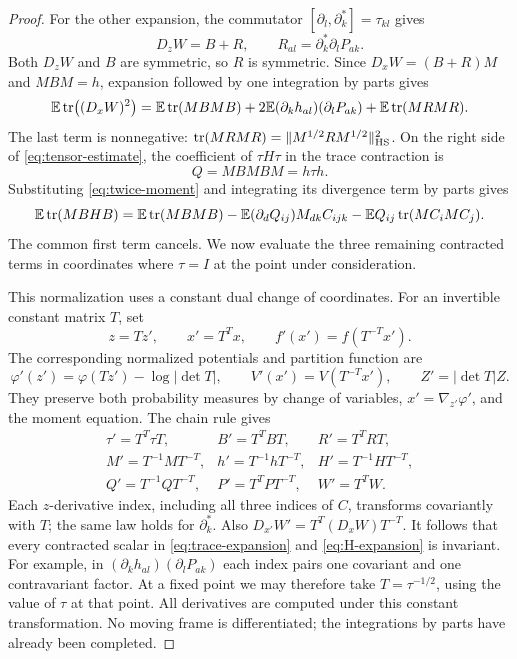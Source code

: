 \begin{proof}
For the other expansion, the commutator $[\partial_l,\partial_k^*]=\tau_{kl}$ gives
\[
 D_zW=B+R,\qquad R_{al}=\partial_k^*\partial_lP_{ak}.
\]
Both $D_zW$ and $B$ are symmetric, so $R$ is symmetric. Since $D_xW=(B+R)M$ and $MBM=h$, expansion followed by one integration by parts gives
\begin{equation}\label{eq:trace-expansion}
 \mathbb{E}\tr\bigl((D_xW)^2\bigr)
 =\mathbb{E}\tr(MBMB)
  +2\mathbb{E}(\partial_kh_{al})(\partial_lP_{ak})
  +\mathbb{E}\tr(MRMR).
\end{equation}
The last term is nonnegative: $\tr(MRMR)=\|M^{1/2}RM^{1/2}\|_{\mathrm{HS}}^2$. On the right side of \eqref{eq:tensor-estimate}, the coefficient of $\tau H\tau$ in the trace contraction is
\[
 Q=MBMBM=h\tau h.
\]
Substituting \eqref{eq:twice-moment} and integrating its divergence term by parts gives
\begin{equation}\label{eq:H-expansion}
 \mathbb{E}\tr(MBHB)
 =\mathbb{E}\tr(MBMB)
   -\mathbb{E}(\partial_dQ_{ij})M_{dk}C_{ijk}
   -\mathbb{E}Q_{ij}\tr(MC_iMC_j).
\end{equation}
The common first term cancels.  We now evaluate the three remaining contracted terms in coordinates where $\tau=I$ at the point under consideration.

This normalization uses a constant dual change of coordinates. For an invertible constant matrix $T$, set
\[
 z=Tz',\qquad x'=T^Tx,\qquad
 f'(x')=f(T^{-T}x').
\]
The corresponding normalized potentials and partition function are
\[
 \varphi'(z')=\varphi(Tz')-\log|\det T|,
 \qquad V'(x')=V(T^{-T}x'),
 \qquad Z'=|\det T|Z.
\]
They preserve both probability measures by change of variables, $x'=\nabla_{z'}\varphi'$, and the moment equation.  The chain rule gives
\[
 \begin{array}{lll}
 \tau'=T^T\tau T,& B'=T^TBT,& R'=T^TRT,\\
 M'=T^{-1}MT^{-T},& h'=T^{-1}hT^{-T},& H'=T^{-1}HT^{-T},\\
 Q'=T^{-1}QT^{-T},& P'=T^TPT^{-T},& W'=T^TW.
 \end{array}
\]
Each $z$-derivative index, including all three indices of $C$, transforms covariantly with $T$; the same law holds for $\partial_k^*$. Also $D_{x'}W'=T^T(D_xW)T^{-T}$. It follows that every contracted scalar in \eqref{eq:trace-expansion} and \eqref{eq:H-expansion} is invariant. For example, in $(\partial_kh_{al})(\partial_lP_{ak})$ each index pairs one covariant and one contravariant factor. At a fixed point we may therefore take $T=\tau^{-1/2}$, using the value of $\tau$ at that point.  All derivatives are computed under this constant transformation.  No moving frame is differentiated; the integrations by parts have already been completed.


\end{proof}
